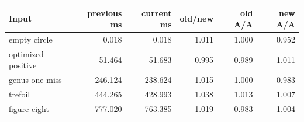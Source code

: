 \begin{center}
\small
\begin{tabular}{lrrrrr}
\toprule
Input & previous ms & current ms & old/new & old A/A & new A/A\\
\midrule
empty circle & 0.018 & 0.018 & 1.011 & 1.000 & 0.952\\
optimized positive & 51.464 & 51.683 & 0.995 & 0.989 & 1.011\\
genus one miss & 246.124 & 238.624 & 1.015 & 1.000 & 0.983\\
trefoil & 444.265 & 428.993 & 1.038 & 1.013 & 1.007\\
figure eight & 777.020 & 763.385 & 1.019 & 0.983 & 1.004\\
\bottomrule
\end{tabular}
\end{center}
